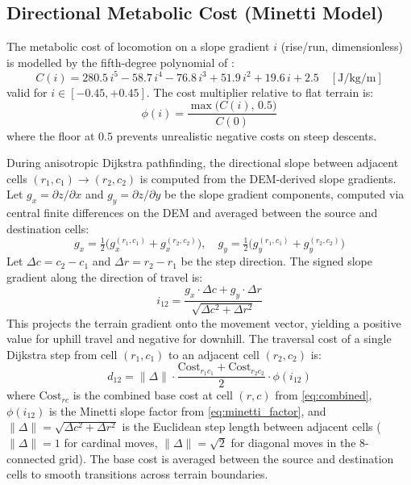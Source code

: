 \documentclass[11pt,a4paper]{article}
\begin{document}
\subsection{Directional Metabolic Cost (Minetti Model)}
\label{sec:minetti}

The metabolic cost of locomotion on a slope gradient $i$ (rise/run, dimensionless) is modelled by the fifth-degree polynomial of \citet{minetti2002}:
\begin{equation}
  C(i) = 280.5\,i^5 - 58.7\,i^4 - 76.8\,i^3 + 51.9\,i^2 + 19.6\,i + 2.5 \quad [\text{J/kg/m}]
  \label{eq:minetti}
\end{equation}
valid for $i \in [-0.45, +0.45]$.
The cost multiplier relative to flat terrain is:
\begin{equation}
  \phi(i) = \frac{\max\bigl(C(i),\, 0.5\bigr)}{C(0)}
  \label{eq:minetti_factor}
\end{equation}
where the floor at $0.5$ prevents unrealistic negative costs on steep descents.

During anisotropic Dijkstra pathfinding, the directional slope between adjacent cells $(r_1, c_1) \to (r_2, c_2)$ is computed from the DEM-derived slope gradients.
Let $g_x = \partial z / \partial x$ and $g_y = \partial z / \partial y$ be the slope gradient components, computed via central finite differences on the DEM and averaged between the source and destination cells:
\begin{equation}
  g_x = \tfrac{1}{2}\bigl(g_x^{(r_1,c_1)} + g_x^{(r_2,c_2)}\bigr), \quad
  g_y = \tfrac{1}{2}\bigl(g_y^{(r_1,c_1)} + g_y^{(r_2,c_2)}\bigr)
  \label{eq:gradavg}
\end{equation}
Let $\Delta c = c_2 - c_1$ and $\Delta r = r_2 - r_1$ be the step direction.
The signed slope gradient along the direction of travel is:
\begin{equation}
  i_{12} = \frac{g_x \cdot \Delta c + g_y \cdot \Delta r}{\sqrt{\Delta c^2 + \Delta r^2}}
  \label{eq:dirslope}
\end{equation}
This projects the terrain gradient onto the movement vector, yielding a positive value for uphill travel and negative for downhill.
The traversal cost of a single Dijkstra step from cell $(r_1, c_1)$ to an adjacent cell $(r_2, c_2)$ is:
\begin{equation}
  d_{12} = \|\Delta\| \cdot \frac{\text{Cost}_{r_1 c_1} + \text{Cost}_{r_2 c_2}}{2} \cdot \phi(i_{12})
  \label{eq:edgecost}
\end{equation}
where $\text{Cost}_{rc}$ is the combined base cost at cell $(r,c)$ from \cref{eq:combined}, $\phi(i_{12})$ is the Minetti slope factor from \cref{eq:minetti_factor}, and $\|\Delta\| = \sqrt{\Delta c^2 + \Delta r^2}$ is the Euclidean step length between adjacent cells ($\|\Delta\| = 1$ for cardinal moves, $\|\Delta\| = \sqrt{2}$ for diagonal moves in the 8-connected grid).
The base cost is averaged between the source and destination cells to smooth transitions across terrain boundaries.
\end{document}
